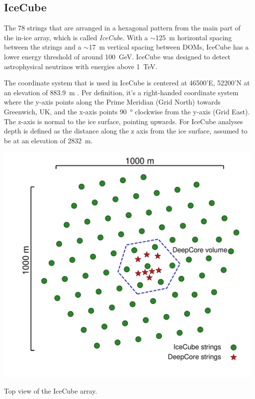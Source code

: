 \subsection{IceCube}

The 78 strings that are arranged in a hexagonal pattern from the main part of the in-ice array, which is called \textit{IceCube}. With a $\sim$\SI{125}{\metre} horizontal spacing between the strings and a $\sim$\SI{17}{\metre} vertical spacing between DOMs, IceCube has a lower energy threshold of around \SI{100}{GeV}. IceCube was designed to detect astrophysical neutrinos with energies above \SI{1}{\tera\electronvolt}.

The coordinate system that is used in IceCube is centered at 46500'E, 52200'N at an elevation of \SI{883.9}{\metre} . Per definition, it's a right-handed coordinate system where the y-axis points along the Prime Meridian (Grid North) towards Greenwich, UK, and the x-axis points \SI{90}{\degree} clockwise from the y-axis (Grid East). The z-axis is normal to the ice surface, pointing upwards. For IceCube analyses depth is defined as the distance along the z axis from the ice surface, assumed to be at an elevation of \SI{2832}{\metre}.



\begin{marginfigure}
    \includegraphics[trim={2.0cm, 1.5cm, 0, 0}, clip, width=1.0\linewidth]{figures/icecube_deepcore/icecube_top_view_bw.pdf}
    \caption[IceCube top view]{Top view of the IceCube array.}
\end{marginfigure}

